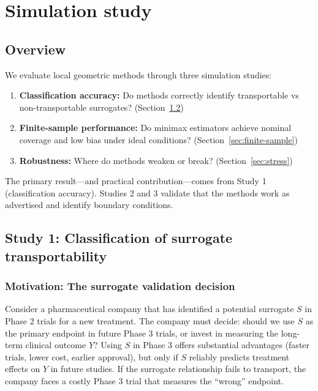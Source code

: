 \section{Simulation study}\label{sec:simulation}

\subsection{Overview}

We evaluate local geometric methods through three simulation studies:
\begin{enumerate}
    \item \textbf{Classification accuracy:} Do methods correctly identify transportable vs non-transportable surrogates? (Section~\ref{sec:classification})

    \item \textbf{Finite-sample performance:} Do minimax estimators achieve nominal coverage and low bias under ideal conditions? (Section~\ref{sec:finite-sample})

    \item \textbf{Robustness:} Where do methods weaken or break? (Section~\ref{sec:stress})
\end{enumerate}

The primary result---and practical contribution---comes from Study 1 (classification accuracy). Studies 2 and 3 validate that the methods work as advertised and identify boundary conditions.

\subsection{Study 1: Classification of surrogate transportability}\label{sec:classification}

\subsubsection{Motivation: The surrogate validation decision}

Consider a pharmaceutical company that has identified a potential surrogate $S$ in Phase 2 trials for a new treatment. The company must decide: should we use $S$ as the primary endpoint in future Phase 3 trials, or invest in measuring the long-term clinical outcome $Y$? Using $S$ in Phase 3 offers substantial advantages (faster trials, lower cost, earlier approval), but only if $S$ reliably predicts treatment effects on $Y$ in future studies. If the surrogate relationship fails to transport, the company faces a costly Phase 3 trial that measures the ``wrong'' endpoint.

